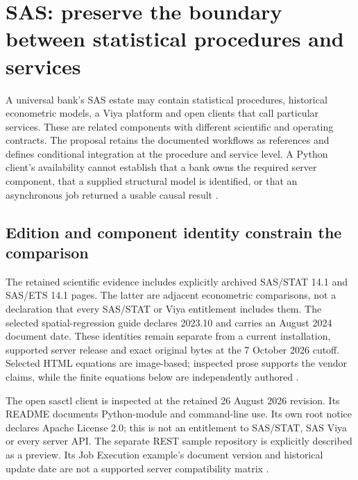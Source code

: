 \section{SAS: preserve the boundary between statistical procedures and services}
\label{sec:exec24-sas-reuse}

A universal bank's SAS estate may contain statistical procedures, historical
econometric models, a Viya platform and open clients that call particular
services. These are related components with different scientific and operating
contracts. The proposal retains the documented workflows as references and
defines conditional integration at the procedure and service level. A Python
client's availability cannot establish that a bank owns the required server
component, that a supplied structural model is identified, or that an
asynchronous job returned a usable causal result
\citep{exec13_latent_sas_calis,exec23_workflow_sasctl,
exec23_workflow_delegates_sasctl,exec24_sas_choice}.

\subsection{Edition and component identity constrain the comparison}
The retained scientific evidence includes explicitly archived SAS/STAT 14.1
and SAS/ETS 14.1 pages. The latter are adjacent econometric comparisons,
not a declaration that every SAS/STAT or Viya entitlement includes them.
The selected spatial-regression guide declares 2023.10 and carries an
August 2024 document date. These identities remain separate from a current
installation, supported server release and exact original bytes at the
7 October 2026 cutoff. Selected HTML equations are image-based; inspected
prose supports the vendor claims, while the finite equations below are
independently authored
\citep{exec13_ct_sas_causal,exec13_ivrd_sas,
exec20_network_sas_latest_spatial,exec24_sas_choice}.

The open sasctl client is inspected at the retained 26 August 2026 revision.
Its README documents Python-module and command-line use. Its own root notice
declares Apache License 2.0; this is not an entitlement to SAS/STAT, SAS Viya
or every server API. The separate REST sample repository is explicitly
described as a preview. Its Job Execution example's document version and
historical update date are not a supported server compatibility matrix
\citep{exec23_workflow_sasctl,exec24_workflow_contracts_sas}.


